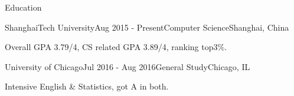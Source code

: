\documentclass{resume} %
\begin{document}

\begin{rSection}{Education}

\begin{rSubsection}
  {ShanghaiTech University}{Aug 2015 - Present}{Computer Science}{Shanghai, China}
    \item Overall GPA 3.79/4, CS related GPA 3.89/4, ranking top3\%.
\end{rSubsection}


\begin{rSubsection}
  {University of Chicago}{Jul 2016 - Aug 2016}{General Study}{Chicago, IL}
    \item Intensive English \& Statistics, got A in both.
\end{rSubsection}
\end{rSection}
\end{document}
